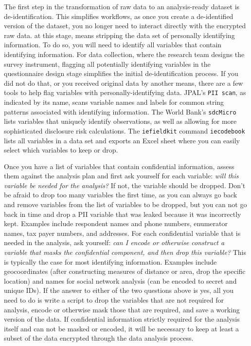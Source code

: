 The first step in the transformation of raw data to an analysis-ready dataset is de-identification.
This simplifies workflows, as once you create a de-identified version of the dataset,
you no longer need to interact directly with the encrypted raw data.
at this stage, means stripping the data set of personally identifying information.
To do so, you will need to identify all variables that contain
identifying information.
For data collection, where the research team designs the survey instrument,
flagging all potentially identifying variables in the questionnaire design stage
simplifies the initial de-identification process.
If you did not do that, or you received original data by another means,
there are a few tools to help flag variables with personally-identifying data.
JPAL's \texttt{PII scan}, as indicated by its name,
scans variable names and labels for common string patterns associated with identifying information.
The World Bank's \texttt{sdcMicro}
lists variables that uniquely identify observations,
as well as allowing for more sophisticated disclosure risk calculations.
The \texttt{iefieldkit} command \texttt{iecodebook}
lists all variables in a data set and exports an Excel sheet
where you can easily select which variables to keep or drop.

Once you have a list of variables that contain confidential information,
assess them against the analysis plan and first ask yourself for each variable:
\textit{will this variable be needed for the analysis?}
If not, the variable should be dropped.
Don't be afraid to drop too many variables the first time,
as you can always go back and remove variables from the list of variables to be dropped,
but you can not go back in time and drop a PII variable that was leaked
because it was incorrectly kept.
Examples include respondent names and phone numbers, enumerator names, tax payer numbers, and addresses.
For each confidential variable that is needed in the analysis, ask yourself:
\textit{can I encode or otherwise construct a variable that masks the confidential component, and
then drop this variable?}
This is typically the case for most identifying information.
Examples include geocoordinates
(after constructing measures of distance or area,
drop the specific location)
and names for social network analysis (can be encoded to secret and unique IDs).
If the answer to either of the two questions above is yes,
all you need to do is write a script to drop the variables that are not required for analysis,
encode or otherwise mask those that are required,
and save a working version of the data.
If confidential information strictly required for the analysis itself and can not be
masked or encoded,
it will be necessary to keep at least a subset of the data encrypted through
the data analysis process.

